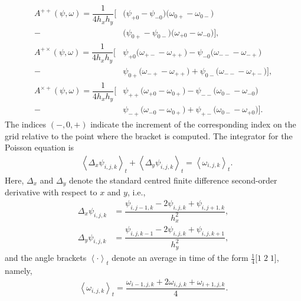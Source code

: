\documentclass[12pt,a4paper,reqno]{article}
\begin{document}
\begin{subequations}\label{eq:brackets_poisson_arakawa_4}
\begin{align}
A^{++} (\psi, \omega)
\nonumber
= \dfrac{1}{4 h_{x} h_{y}} \Big[
 & \big( \psi_{+0} - \psi_{-0} \big) \big( \omega_{0+} - \omega_{0-} \big) \\
-& \big( \psi_{0+} - \psi_{0-} \big) \big( \omega_{+0} - \omega_{-0} \big) \Big] , \\
A^{+ \times} (\psi, \omega)
\nonumber
= \dfrac{1}{4 h_{x} h_{y}} \Big[
 & \psi_{+0} \big( \omega_{+-} - \omega_{++} \big) - \psi_{-0} \big( \omega_{--} - \omega_{-+} \big) \\
-& \psi_{0+} \big( \omega_{-+} - \omega_{++} \big) + \psi_{0-} \big( \omega_{--} - \omega_{+-} \big) \Big] , \\
A^{\times +} (\psi, \omega)
\nonumber
= \dfrac{1}{4 h_{x} h_{y}} \Big[
 & \psi_{++} \big( \omega_{+0} - \omega_{0+} \big) - \psi_{--} \big( \omega_{0-} - \omega_{-0} \big) \\
-& \psi_{-+} \big( \omega_{-0} - \omega_{0+} \big) + \psi_{+-} \big( \omega_{0-} - \omega_{+0} \big) \Big] .
\end{align}
\end{subequations}
\endgroup
The indices $(-,0,+)$ indicate the increment of the corresponding index on the grid relative to the point where the bracket is computed.
The integrator for the Poisson equation is
\begin{align}\label{eq:vorticity_integrator_poisson}
& {\ensuremath{\left < {\Delta_{x} \psi_{i,j,k}} \right >}}_{t}
+ {\ensuremath{\left < {\Delta_{y} \psi_{i,j,k}} \right >}}_{t}
= {\ensuremath{\left < {\omega_{i,j,k}} \right >}}_{t} .
\end{align}
Here, $\Delta_{x}$ and $\Delta_{y}$ denote the standard centred finite difference second-order derivative with respect to $x$ and $y$, i.e.,
\begin{align*}
\Delta_{x} \psi_{i,j,k} &= \dfrac{\psi_{i,j-1,k} - 2 \psi_{i,j,k} + \psi_{i,j+1,k}}{h_{x}^{2}} , \\
\Delta_{y} \psi_{i,j,k} &= \dfrac{\psi_{i,j,k-1} - 2 \psi_{i,j,k} + \psi_{i,j,k+1}}{h_{y}^{2}} ,
\end{align*}
and the angle brackets ${\ensuremath{\left < {\cdot} \right >}}_{t}$ denote an average in time of the form $\tfrac{1}{4} \big[ 1 \; 2 \; 1 \big]$, namely,
\begin{align*}
{\ensuremath{\left < {\omega_{i,j,k}} \right >}}_{t} = \dfrac{\omega_{i-1,j,k} + 2 \omega_{i,j,k} + \omega_{i+1,j,k}}{4} .
\end{align*}
\end{document}
